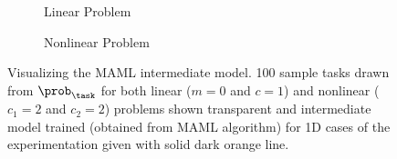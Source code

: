 \begin{figure}[ht!]
  \centering
  \begin{subfigure}[b]{0.49\textwidth}
    \centering
    \caption{Linear Problem}
    \label{fig:lin_maml}
  \end{subfigure}
  \begin{subfigure}[b]{0.49\textwidth}
    \centering
    \caption{Nonlinear Problem}
    \label{fig:nonlin_maml}
  \end{subfigure}
  \caption{Visualizing the MAML intermediate model. 100 sample tasks drawn from $\prob_\task$ for both linear ($m=0$ and $c=1$) and nonlinear ($c_1=2$ and $c_2=2$) problems shown transparent and intermediate model trained (obtained from MAML algorithm) for 1D cases of the experimentation given with solid dark orange line.}
\end{figure}


